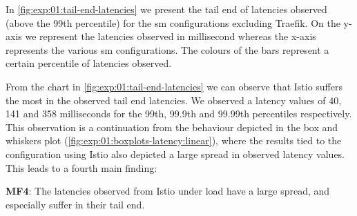 In \cref{fig:exp:01:tail-end-latencies} we present the tail end of latencies observed (above the 99th percentile) for the \gls{sm} configurations excluding Traefik. On the y-axis we represent the latencies observed in millisecond whereas the x-axis represents the various \gls{sm} configurations. The colours of the bars represent a certain percentile of latencies observed.

From the chart in \cref{fig:exp:01:tail-end-latencies} we can observe that Istio suffers the most in the observed tail end latencies. We observed a latency values of 40, 141 and 358 milliseconds for the 99th, 99.9th and 99.99th percentiles respectively. This observation is a continuation from the behaviour depicted in the box and whiskers plot (\cref{fig:exp:01:boxplots-latency:linear}), where the results tied to the configuration using Istio also depicted a large spread in observed latency values. This leads to a fourth main finding:

\begin{shaded*}
    \noindent
    \textbf{MF4}: 
    The latencies observed from Istio under load have a large spread, and especially suffer in their tail end.
\end{shaded*}

